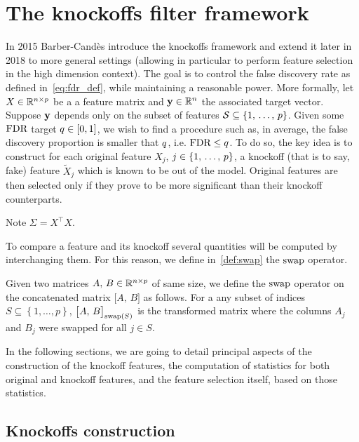\chapter{The knockoffs filter framework}\label{ch:knockoffs}

In 2015 Barber-Candès introduce the knockoffs framework and extend it later in 2018 to more general settings
(allowing in particular to perform feature selection in the high dimension context).
The goal is to control the false discovery rate as defined in~\ref{eq:fdr_def}, while maintaining a reasonable power.
More formally, let $X \in \mathbb{R}^{n \times p}$ be a a feature matrix and $\mathbf{y} \in \mathbb{R}^n$ the associated target vector.
Suppose $\mathbf{y}$ depends only on the subset of features $\mathcal{S} \subseteq \left\{ 1,\, \dots,\, p \right\}$.
Given some $\text{FDR}$ target $q \in [0, 1]$, we wish to find a procedure such as, in average,
the false discovery proportion is smaller that $q$, i.e. $\text{FDR} \leq q$.
To do so, the key idea is to construct for each original feature $X_j$, $j \in \left\{ 1,\, \dots,\, p \right\}$,
a knockoff (that is to say, fake) feature $\tilde{X}_j$ which is known to be out of the model.
Original features are then selected only if they prove to be more significant than their knockoff counterparts.

Note $\Sigma = X^\top X$.

To compare a feature and its knockoff several quantities will be computed by interchanging them.
For this reason, we define in~\ref{def:swap} the $\operatorname{swap}$ operator.
\begin{definition}\label{def:swap}
    Given two matrices $A,\,B \in \mathbb{R}^{n \times p}$ of same size,
    we define the $\operatorname{swap}$ operator on the concatenated matrix $\big[ A,\, B \big]$ as follows.
    For a any subset of indices $S \subseteq \left\{ 1, \dots, p \right\}$,
    $\big[ A,\, B \big]_{\operatorname{swap}(S)}$ is the transformed matrix where the columns $A_j$ and $B_j$ were swapped for all
    $j \in S$.
\end{definition}

In the following sections, we are going to detail principal aspects of the construction of the knockoff features,
the computation of statistics for both original and knockoff features,
and the feature selection itself, based on those statistics.

\section{Knockoffs construction}\label{sec:kc}

